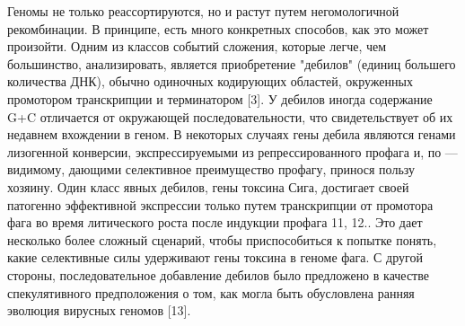 \documentclass[a4paper,12pt]{article}
\begin{document}
    \par{Геномы не только реассортируются, но и растут путем негомологичной рекомбинации. В принципе, есть много
    конкретных способов, как это может произойти. Одним из классов событий сложения, которые легче, чем большинство,
    анализировать, является приобретение "дебилов" (единиц большего количества ДНК), обычно одиночных кодирующих
    областей, окруженных промотором транскрипции и терминатором [3]. У дебилов иногда содержание G+C отличается от
    окружающей последовательности, что свидетельствует об их недавнем вхождении в геном. В некоторых случаях гены дебила
    являются генами лизогенной конверсии, экспрессируемыми из репрессированного профага и, по — видимому, дающими
    селективное преимущество профагу, принося пользу хозяину. Один класс явных дебилов, гены токсина Сига, достигает
    своей патогенно эффективной экспрессии только путем транскрипции от промотора фага во время литического роста после
    индукции профага 11, 12.. Это дает несколько более сложный сценарий, чтобы приспособиться к попытке понять, какие
    селективные силы удерживают гены токсина в геноме фага. С другой стороны, последовательное добавление дебилов было
    предложено в качестве спекулятивного предположения о том, как могла быть обусловлена ранняя эволюция вирусных
    геномов [13].}
    
\end{document}
